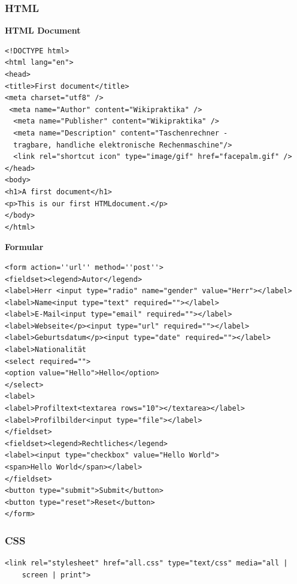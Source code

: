 

\thispagestyle{fancy}
\raggedright
\footnotesize
\raggedcolumns
\begin{multicols*}{4}
\setlength{\premulticols}{1pt}
\setlength{\postmulticols}{1pt}
\setlength{\multicolsep}{1pt}
\setlength{\columnsep}{2pt}
\tiny

\subsubsection{HTML}

\textbf{HTML Document}
 \begin{verbatim}
<!DOCTYPE html>
<html lang="en"> 
<head>
<title>First document</title>
<meta charset="utf­8" /> 
 <meta name="Author" content="Wikipraktika" />
  <meta name="Publisher" content="Wikipraktika" />
  <meta name="Description" content="Taschenrechner - 
  tragbare, handliche elektronische Rechenmaschine"/>
  <link rel="shortcut icon" type="image/gif" href="facepalm.gif" />
</head>
<body>
<h1>A first document</h1>
<p>This is our first HTML­document.</p> 
</body>
</html>
\end{verbatim}

\textbf{Formular}
 \begin{verbatim}
<form action=''url'' method=''post''>
<fieldset><legend>Autor</legend>
<label>Herr <input type="radio" name="gender" value="Herr"></label>
<label>Name<input type="text" required=""></label>
<label>E-Mail<input type="email" required=""></label>
<label>Webseite</p><input type="url" required=""></label>
<label>Geburtsdatum</p><input type="date" required=""></label>
<label>Nationalität
<select required="">
<option value="Hello">Hello</option>
</select>
<label>
<label>Profiltext<textarea rows="10"></textarea></label>
<label>Profilbilder<input type="file"></label>
</fieldset>
<fieldset><legend>Rechtliches</legend>
<label><input type="checkbox" value="Hello World">
<span>Hello World</span></label>
</fieldset>
<button type="submit">Submit</button>
<button type="reset">Reset</button>
</form>
\end{verbatim}

\subsubsection{CSS}
 \begin{verbatim}
<link rel="stylesheet" href="all.css" type="text/css" media="all | 
    screen | print">
 \end{verbatim}
 

\end{multicols*}
